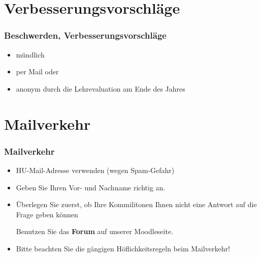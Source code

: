 \section{Verbesserungsvorschläge}

\begin{frame}
\frametitle{Beschwerden, Verbesserungsvorschläge}

\begin{itemize}
      \item mündlich
      \item per Mail oder 
      \item anonym durch die Lehrevaluation am Ende des Jahres
\end{itemize}
\end{frame}


\section{Mailverkehr}

\begin{frame}
\frametitle{Mailverkehr}

\begin{itemize}
	\item HU-Mail-Adresse verwenden (wegen Spam-Gefahr)
	
	\item Geben Sie Ihren Vor- und Nachname richtig an.

	\item Überlegen Sie zuerst, ob Ihre Kommilitonen Ihnen nicht eine Antwort auf die Frage geben können
	
	\ras Benutzen Sie das \textbf{Forum} auf unserer Moodleseite.
	
	\item Bitte beachten Sie die gängigen Höflichkeitsregeln beim Mailverkehr!
\end{itemize}

\end{frame}
